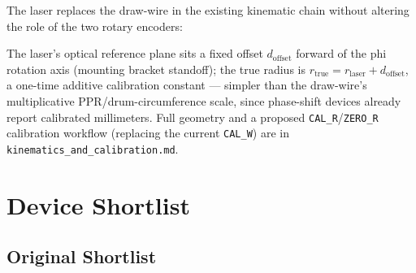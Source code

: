 \documentclass[11pt]{article}
\begin{document}
The laser replaces the draw-wire in the existing kinematic chain without altering the role of the two rotary encoders:

\begin{center}
\end{center}

The laser's optical reference plane sits a fixed offset $d_{\text{offset}}$ forward of the phi rotation axis (mounting bracket standoff); the true radius is $r_{\text{true}} = r_{\text{laser}} + d_{\text{offset}}$, a one-time additive calibration constant --- simpler than the draw-wire's multiplicative PPR/drum-circumference scale, since phase-shift devices already report calibrated millimeters. Full geometry and a proposed \texttt{CAL\_R}/\texttt{ZERO\_R} calibration workflow (replacing the current \texttt{CAL\_W}) are in \texttt{kinematics\_and\_calibration.md}.

\section{Device Shortlist}
\label{sec:devices}

\subsection{Original Shortlist}
\end{document}
